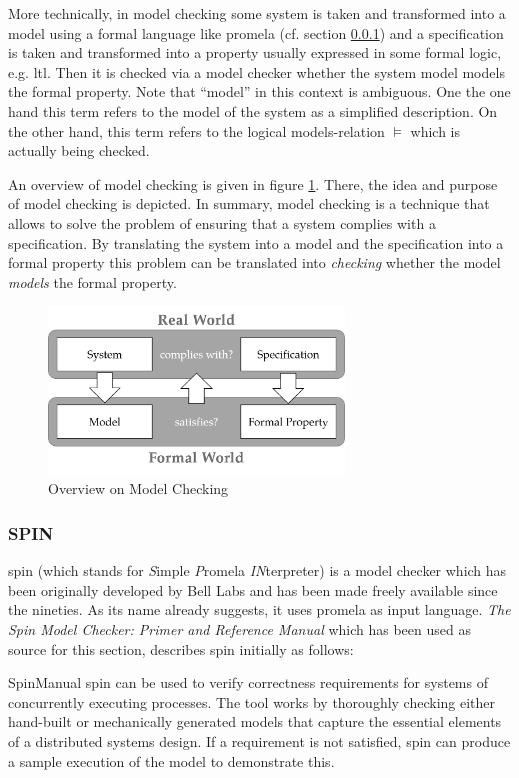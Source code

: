 More technically, in model checking some system is taken and transformed into a model using a formal language like \gls{promela} (cf. section \ref{sec:spin}) and a specification is taken and transformed into a property usually expressed in some formal logic, e.g. \gls{ltl}.
Then it is checked via a model checker whether the system model models the formal property.
Note that \enquote{model} in this context is ambiguous.
One the one hand this term refers to the model of the system as a simplified description.
On the other hand, this term refers to the logical models-relation $ \models $ which is actually being checked.

An overview of model checking is given in figure \ref{fig:model-checking}.
There, the idea and purpose of model checking is depicted.
In summary, model checking is a technique that allows to solve the problem of ensuring that a system complies with a specification.
By translating the system into a model and the specification into a formal property this problem can be translated into \textit{checking} whether the model \textit{models} the formal property.

\begin{figure}
    \centering
    \includegraphics[width=0.7\textwidth]{figures/model-checking.png}
    \caption{Overview on Model Checking}
    \label{fig:model-checking}
\end{figure}

\subsubsection{SPIN}
\label{sec:spin}

\gls{spin} (which stands for \textit{S}imple \textit{P}romela \textit{IN}terpreter) is a model checker which has been originally developed by Bell Labs and has been made freely available since the nineties.
As its name already suggests, it uses \gls{promela} as input language.
\textit{The Spin Model Checker: Primer and Reference Manual} which has been used as source for this section, describes \gls{spin} initially as follows:
\begin{displaycquote}[p.1]{SpinManual}
    \gls{spin} can be used to verify correctness requirements for systems of concurrently executing processes.
    The tool works by thoroughly checking either hand-built or mechanically generated models that capture the essential elements of a distributed systems design.
    If a requirement is not satisfied, \gls{spin} can produce a sample execution of the model to demonstrate this.
\end{displaycquote}

